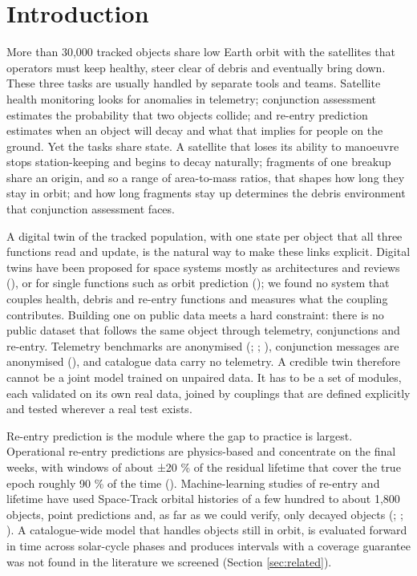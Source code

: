 \documentclass[
]{article}
\begin{document}
\section{Introduction}\label{sec:intro}

More than 30,000 tracked objects share low Earth orbit with the
satellites that operators must keep healthy, steer clear of debris and
eventually bring down. These three tasks are usually handled by separate
tools and teams. Satellite health monitoring looks for anomalies in
telemetry; conjunction assessment estimates the probability that two
objects collide; and re-entry prediction estimates when an object will
decay and what that implies for people on the ground. Yet the tasks
share state. A satellite that loses its ability to manoeuvre stops
station-keeping and begins to decay naturally; fragments of one breakup
share an origin, and so a range of area-to-mass ratios, that shapes how
long they stay in orbit; and how long fragments stay up determines the
debris environment that conjunction assessment faces.

A digital twin of the tracked population, with one state per object that
all three functions read and update, is the natural way to make these
links explicit. Digital twins have been proposed for space systems
mostly as architectures and reviews (), or for single functions such as orbit prediction
(); we found no system that
couples health, debris and re-entry functions and measures what the
coupling contributes. Building one on public data meets a hard
constraint: there is no public dataset that follows the same object
through telemetry, conjunctions and re-entry. Telemetry benchmarks are
anonymised (;
;
), conjunction
messages are anonymised (), and catalogue data carry no telemetry. A credible twin
therefore cannot be a joint model trained on unpaired data. It has to be
a set of modules, each validated on its own real data, joined by
couplings that are defined explicitly and tested wherever a real test
exists.

Re-entry prediction is the module where the gap to practice is largest.
Operational re-entry predictions are physics-based and concentrate on
the final weeks, with windows of about ±20 \% of the residual lifetime
that cover the true epoch roughly 90 \% of the time
().
Machine-learning studies of re-entry and lifetime have used Space-Track
orbital histories of a few hundred to about 1,800 objects, point
predictions and, as far as we could verify, only decayed objects
(;
;
). A
catalogue-wide model that handles objects still in orbit, is evaluated
forward in time across solar-cycle phases and produces intervals with a
coverage guarantee was not found in the literature we screened (Section
\ref{sec:related}).
\end{document}

